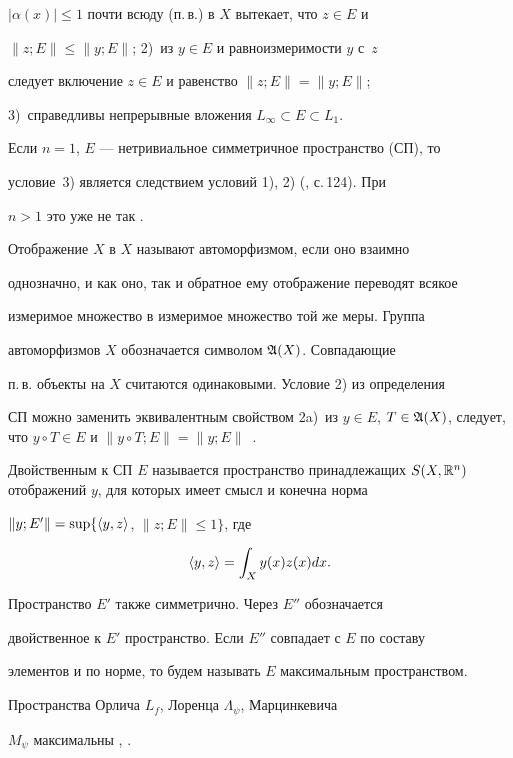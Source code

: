$|\alpha(x)|\le1$ почти всюду (п.\,в.) в $X$ вытекает, что $z\in E$ и 


$\|z;E\|\le\|y;E\|$; 2)~из $y\in E$ и равноизмеримости $y$ с~$z$ 


следует включение $z\in E$ и равенство $\|z;E\|=\|y;E\|$; 


3)~справедливы непрерывные вложения $L_\infty\subset E\subset L_1$. 


Если $n=1$, $E$ --- нетривиальное симметричное пространство (СП), то 


условие~3) является следствием условий 1), 2) (\cite{2}, с.\,124). При 


$n>1$ это уже не так \cite{3}. 


 


Отображение $X$ в $X$ называют автоморфизмом, если оно взаимно 


однозначно, и как оно, так и обратное ему отображение переводят всякое 


измеримое множество в измеримое множество той же меры. Группа 


автоморфизмов $X$ обозначается символом $\frak A(X)$. Совпадающие 


п.\,в. объекты на $X$ считаются одинаковыми. Условие 2) из определения 


СП можно заменить эквивалентным свойством 2a)~из $y\in E$, $T\in\frak 


A(X)$, следует, что $y\circ T\in E$ и $\|y\circ T;E\|=\|y;E\|$~\cite{3}. 


 


Двойственным к СП $E$ называется пространство принадлежащих $S(X,\Bbb 


R^n)$ отображений $y$, для которых имеет смысл и конечна норма 


$\|y;E'\|=\sup\{\langle y,z\rangle$, $\|z;E\|\le1\}$, где 


$$ 


\la y,z\ra=\int_X y(x)z(x)d x. 


$$ 


Пространство $E'$ также симметрично. Через $E''$ обозначается 


двойственное к $E'$ пространство. Если $E''$ совпадает с $E$ по составу 


элементов и по норме, то будем называть $E$ максимальным пространством. 


Пространства Орлича $L_f$, Лоренца $\Lambda_\psi$, Марцинкевича 


$M_\psi$ максимальны \cite{2}, \cite{3}. 


